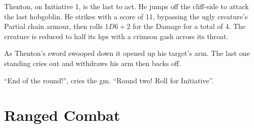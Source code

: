 \begin{multicols}{2}
{\begin{exampletext}
	Thenton, on Initiative 1, is the last to act.
	He jumps off the cliff-side to attack the last hobgoblin.
	He strikes with a score of 11, bypassing the ugly creature's Partial chain armour, then rolls $1D6+2$ for the Damage for a total of 4.
	The creature is reduced to half its \glspl{hp} with a crimson gash across its throat.

	As Thenton's sword swooped down it opened up his target's arm. The last one standing cries out and withdraws his arm then backs off.

	``End of the \gls{round}!'', cries the \gls{gm}. ``Round two! Roll for Initiative''.
\end{exampletext}
}{}

\end{multicols}

\section{Ranged Combat}

